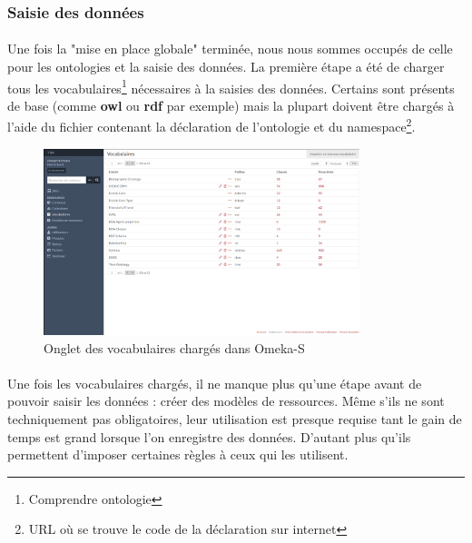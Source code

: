 \subsubsection{Saisie des données}

\paragraph{} \hspace{10mm}
Une fois la "mise en place globale" terminée, nous nous sommes occupés de celle pour les ontologies et la saisie des données. La première étape a été de charger tous les vocabulaires\footnote{Comprendre ontologie} nécessaires à la saisies des données. Certains sont présents de base (comme \textbf{owl} ou \textbf{rdf} par exemple) mais la plupart doivent être chargés à l'aide du fichier contenant la déclaration de l'ontologie et du namespace\footnote{URL où se trouve le code de la déclaration sur internet}.

\begin{figure} [H]
    \centering
    \includegraphics[width=0.82\textwidth]{assets/omeka/onglet_vocabs_omeka.png}
    \caption{Onglet des vocabulaires chargés dans Omeka-S}
    \label{fig:ongletVocabsOmeka}
\end{figure}

\paragraph{} \hspace{10mm}
Une fois les vocabulaires chargés, il ne manque plus qu'une étape avant de pouvoir saisir les données : créer des modèles de ressources. Même s'ils ne sont techniquement pas obligatoires, leur utilisation est presque requise tant le gain de temps est grand lorsque l'on enregistre des données. D'autant plus qu'ils permettent d'imposer certaines règles à ceux qui les utilisent.


